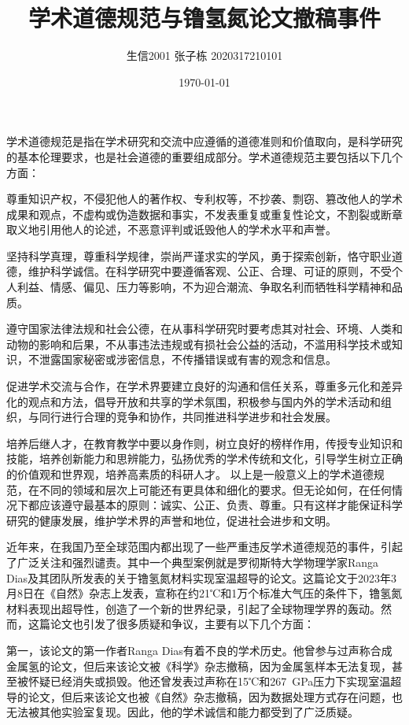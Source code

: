 \documentclass[UTF8]{ctexart}
\title{学术道德规范与镥氢氮论文撤稿事件}
\author{生信2001 张子栋 2020317210101}
\date{\today}
\begin{document}
\pagestyle{fancy}

\maketitle
\thispagestyle{fancy}

学术道德规范是指在学术研究和交流中应遵循的道德准则和价值取向，是科学研究的基本伦理要求，也是社会道德的重要组成部分。学术道德规范主要包括以下几个方面：

尊重知识产权，不侵犯他人的著作权、专利权等，不抄袭、剽窃、篡改他人的学术成果和观点，不虚构或伪造数据和事实，不发表重复或重复性论文，不割裂或断章取义地引用他人的论述，不恶意评判或诋毁他人的学术水平和声誉。

坚持科学真理，尊重科学规律，崇尚严谨求实的学风，勇于探索创新，恪守职业道德，维护科学诚信。在科学研究中要遵循客观、公正、合理、可证的原则，不受个人利益、情感、偏见、压力等影响，不为迎合潮流、争取名利而牺牲科学精神和品质。

遵守国家法律法规和社会公德，在从事科学研究时要考虑其对社会、环境、人类和动物的影响和后果，不从事违法违规或有损社会公益的活动，不滥用科学技术或知识，不泄露国家秘密或涉密信息，不传播错误或有害的观念和信息。

促进学术交流与合作，在学术界要建立良好的沟通和信任关系，尊重多元化和差异化的观点和方法，倡导开放和共享的学术氛围，积极参与国内外的学术活动和组织，与同行进行合理的竞争和协作，共同推进科学进步和社会发展。

培养后继人才，在教育教学中要以身作则，树立良好的榜样作用，传授专业知识和技能，培养创新能力和思辨能力，弘扬优秀的学术传统和文化，引导学生树立正确的价值观和世界观，培养高素质的科研人才。
以上是一般意义上的学术道德规范，在不同的领域和层次上可能还有更具体和细化的要求。但无论如何，在任何情况下都应该遵守最基本的原则：诚实、公正、负责、尊重。只有这样才能保证科学研究的健康发展，维护学术界的声誉和地位，促进社会进步和文明。

近年来，在我国乃至全球范围内都出现了一些严重违反学术道德规范的事件，引起了广泛关注和强烈谴责。其中一个典型案例就是罗彻斯特大学物理学家Ranga Dias及其团队所发表的关于镥氢氮材料实现室温超导的论文。这篇论文于2023年3月8日在《自然》杂志上发表，宣称在约21℃和1万个标准大气压的条件下，镥氢氮材料表现出超导性，创造了一个新的世界纪录，引起了全球物理学界的轰动。然而，这篇论文也引发了很多质疑和争议，主要有以下几个方面：

第一，该论文的第一作者Ranga Dias有着不良的学术历史。他曾参与过声称合成金属氢的论文，但后来该论文被《科学》杂志撤稿，因为金属氢样本无法复现，甚至被怀疑已经消失或损毁。他还曾发表过声称在15℃和267~GPa压力下实现室温超导的论文，但后来该论文也被《自然》杂志撤稿，因为数据处理方式存在问题，也无法被其他实验室复现。因此，他的学术诚信和能力都受到了广泛质疑。
\end{document}
